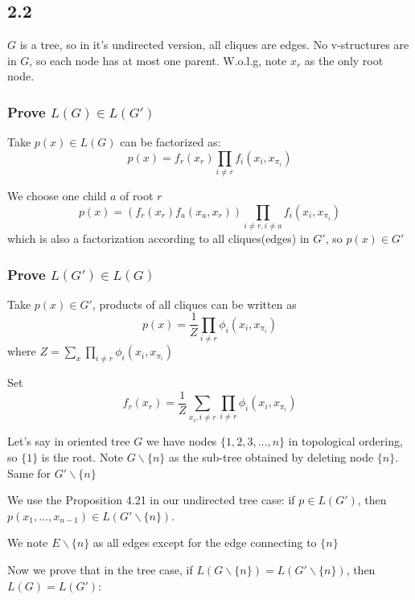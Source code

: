 \documentclass{article}
\begin{document}
	\subsection{2.2}
	$G$ is a tree, so in it's undirected version, all cliques are edges. No v-structures are in $G$, so each node has at most one parent. W.o.l.g, note $x_r$ as the only root node. 
	
	\subsubsection{Prove $L(G) \in L(G')$}
	Take $p(x)\in L(G)$ can be factorized as:
	\begin{equation}
	p(x) = f_r(x_r) \prod_{i\neq r} f_i(x_i, x_{\pi_i})
	\end{equation}
	
	We choose one child $a$ of root $r$
	\begin{equation}
	p(x) = \left( f_r(x_r) f_a(x_a, x_r) \right) \prod_{i\neq r, i\neq a} f_i(x_i, x_{\pi_i})
	\end{equation}
	which is also a factorization according to all cliques(edges) in $G'$, so $p(x) \in G'$
	\subsubsection{Prove $L(G') \in L(G)$}
	Take $p(x)\in G'$, products of all cliques can be written as
	\begin{equation}
	p(x) = \frac{1}{Z}\prod_{i\neq r} \phi_i(x_i, x_{\pi_i})
	\end{equation}
	where $Z = \sum_{x} \prod_{i\neq r} \phi_i(x_i, x_{\pi_i})$
	
	Set 
	\begin{equation}
	f_r(x_r) = \frac{1}{Z} \sum_{x_i, i\neq r} \prod_{i\neq r} \phi_i(x_i, x_{\pi_i})
	\end{equation}
	
	Let's say in oriented tree $G$ we have nodes $\{1,2,3,\dots,n\}$ in topological ordering, so $\{1\}$ is the root. Note $G\backslash \{n\}$ as the sub-tree obtained by deleting node $\{n\}$. Same for $G'\backslash \{n\}$
	
	We use the Proposition 4.21 in our undirected tree case: if $p\in L(G')$, then $p(x_1,\dots,x_{n-1}) \in L(G'\backslash \{n\})$.
	
	We note $E\backslash\{n\}$ as all edges except for the edge connecting to $\{n\}$
	
	Now we prove that in the tree case, if $L(G\backslash\{n\}) = L(G'\backslash\{n\})$, then $L(G)=L(G')$:
	
\end{document}
